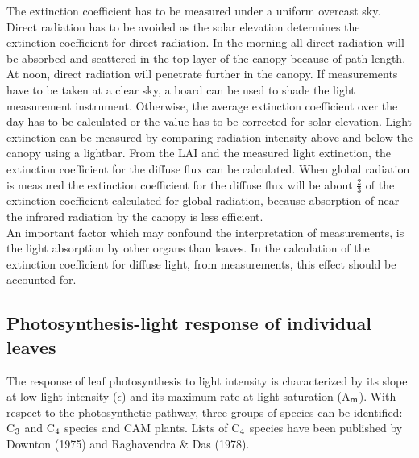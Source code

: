 The extinction coefficient has to be measured under a uniform overcast sky. Direct
radiation has to be avoided as the solar elevation determines the extinction coeffi\-cient for
direct radiation. In the morning all direct radiation will be absorbed and scattered in the
top layer of the canopy because of path length. At noon, direct radiation will penetrate
further in the canopy. If measurements have to be taken at a clear sky, a board can be
used to shade the light measure\-ment instrument. Otherwise, the average extinction
coefficient over the day has to be calculated or the value has to be corrected for solar
elevation. Light extinction can be measured by comparing radiation intensity above and
below the canopy using a lightbar. From the LAI and the measured light extinction, the
extinction coefficient for the diffuse flux can be calculated. When global radiation is
measured the extinction coefficient for the diffuse flux will be about $\frac{2}{3}$ of the extinction
coefficient calculated for global radia\-tion, because absorption of near the infrared
radiation by the canopy is less efficient.\\
An important factor which may confound the interpretation of measurements, is the light
absorption by other organs than leaves. In the calculation of the extinction coefficient for
diffuse light, from measurements, this effect should be accounted for.




\subsection{Photosynthesis-light response of individual leaves  } 

The response of leaf photosynthesis to light intensity is characterized by its slope at low
light intensity ($\epsilon$) and its maximum rate at light saturation (A$_{{\rm m}}$). With respect to the
photosynthetic pathway, three groups of species can be identified: C$_{{\rm 3}}$ and C$_{{\rm 4}}$ species and
CAM plants. Lists of C$_{{\rm 4}}$ species have been published by Downton (1975) and
{\nobreak}Raghavendra \& Das (1978).   

